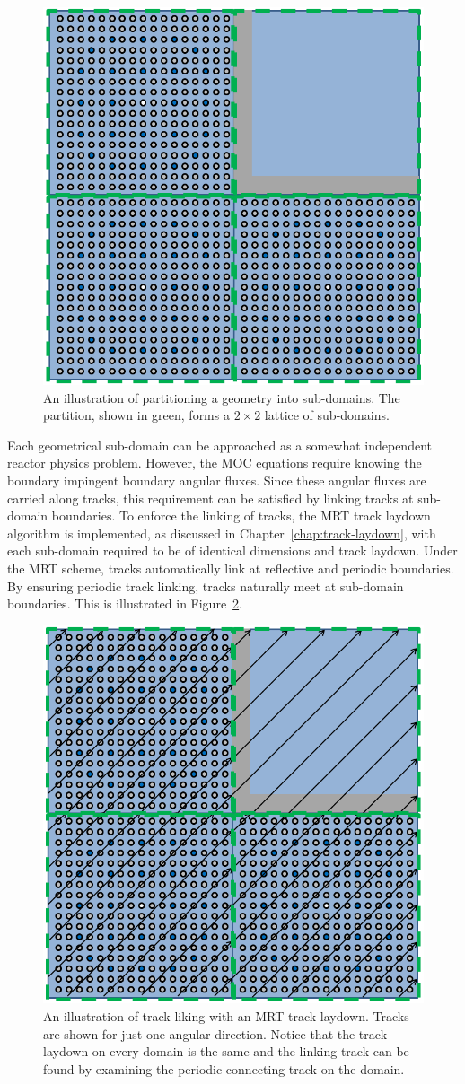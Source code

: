\begin{figure}[h!]
	\centering
	\includegraphics[width=0.6\linewidth]{figures/DD/moc-dd-geometry.PNG}
	\caption[]{An illustration of partitioning a geometry into sub-domains. The partition, shown in green, forms a $2 \times 2$ lattice of sub-domains.}
	\label{fig:domain-partition}
\end{figure}

Each geometrical sub-domain can be approached as a somewhat independent reactor physics problem. However, the \ac{MOC} equations require knowing the boundary impingent boundary angular fluxes. Since these angular fluxes are carried along tracks, this requirement can be satisfied by linking tracks at sub-domain boundaries. To enforce the linking of tracks, the \ac{MRT} track laydown algorithm is implemented, as discussed in Chapter~\ref{chap:track-laydown}, with each sub-domain required to be of identical dimensions and track laydown. Under the \ac{MRT} scheme, tracks automatically link at reflective and periodic boundaries. By ensuring periodic track linking, tracks naturally meet at sub-domain boundaries. This is illustrated in Figure~\ref{fig:domain-track-linking}.

\begin{figure}[h!]
	\centering
	\includegraphics[width=0.6\linewidth]{figures/DD/moc-dd-rays.PNG}
	\caption[]{An illustration of track-liking with an \ac{MRT} track laydown. Tracks are shown for just one angular direction. Notice that the track laydown on every domain is the same and the linking track can be found by examining the periodic connecting track on the domain.}
	\label{fig:domain-track-linking}
\end{figure}

